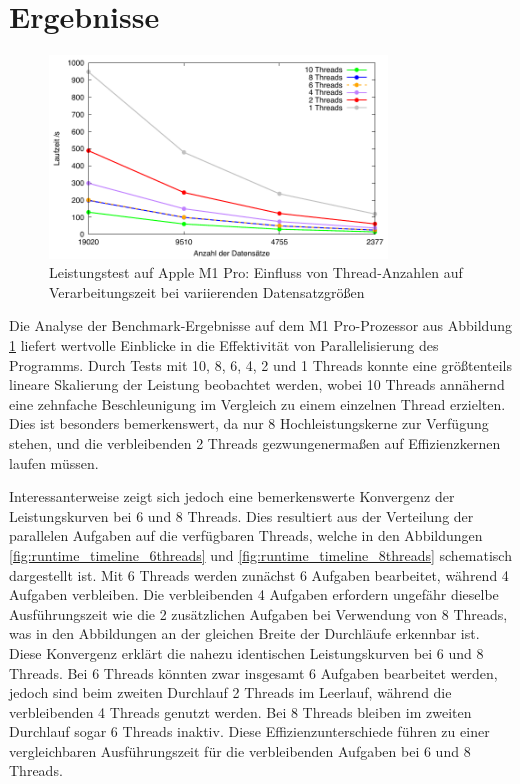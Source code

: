 \section{Ergebnisse}

\begin{figure}[H]
\centering
\includegraphics[width=0.8\textwidth]{../results/plots/m1pro/comp_all_threads.pdf}
\caption{Leistungstest auf Apple M1 Pro: Einfluss von Thread-Anzahlen auf Verarbeitungszeit bei variierenden Datensatzgrößen}
\label{fig:m1pro_benchmark_threads}
\end{figure}

Die Analyse der Benchmark-Ergebnisse auf dem M1 Pro-Prozessor aus Abbildung \ref{fig:m1pro_benchmark_threads} liefert wertvolle Einblicke in die Effektivität von Parallelisierung des Programms. Durch Tests mit 10, 8, 6, 4, 2 und 1 Threads konnte eine größtenteils lineare Skalierung der Leistung beobachtet werden, wobei 10 Threads annähernd eine zehnfache Beschleunigung im Vergleich zu einem einzelnen Thread erzielten. Dies ist besonders bemerkenswert, da nur 8 Hochleistungskerne zur Verfügung stehen, und die verbleibenden 2 Threads gezwungenermaßen auf Effizienzkernen laufen müssen.

Interessanterweise zeigt sich jedoch eine bemerkenswerte Konvergenz der Leistungskurven bei 6 und 8 Threads. Dies resultiert aus der Verteilung der parallelen Aufgaben auf die verfügbaren Threads, welche in den Abbildungen \ref{fig:runtime_timeline_6threads} und \ref{fig:runtime_timeline_8threads} schematisch dargestellt ist. Mit 6 Threads werden zunächst 6 Aufgaben bearbeitet, während 4 Aufgaben verbleiben. Die verbleibenden 4 Aufgaben erfordern ungefähr dieselbe Ausführungszeit wie die 2 zusätzlichen Aufgaben bei Verwendung von 8 Threads, was in den Abbildungen an der gleichen Breite der Durchläufe erkennbar ist. Diese Konvergenz erklärt die nahezu identischen Leistungskurven bei 6 und 8 Threads.
Bei 6 Threads könnten zwar insgesamt 6 Aufgaben bearbeitet werden, jedoch sind beim zweiten Durchlauf 2 Threads im Leerlauf, während die verbleibenden 4 Threads genutzt werden. Bei 8 Threads bleiben im zweiten Durchlauf sogar 6 Threads inaktiv. Diese Effizienzunterschiede führen zu einer vergleichbaren Ausführungszeit für die verbleibenden Aufgaben bei 6 und 8 Threads.

